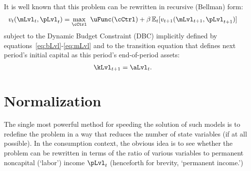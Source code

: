 \documentclass[titlepage, headings=optiontotocandhead]{Resources/texmf-local/tex/latex/econtex}
\begin{document}
It is well known that this problem can be rewritten in recursive (Bellman) form:
  \begin{equation}\begin{gathered}\begin{aligned}
        v_{t}(\mLvl_{t},\pLvl_{t})  & = \max_{\cCtrl}~ \uFunc(\cCtrl) + \beta \Ex_{t}[ v_{t+1}(\mLvl_{t+1},\pLvl_{t+1})]\label{eq:vrecurse}
      \end{aligned}\end{gathered}\end{equation}
subject to the Dynamic Budget Constraint (DBC) implicitly defined by equations~\eqref{eq:bLvl}-\eqref{eq:mLvl} and to the transition equation that defines next period's initial capital as this period's end-of-period assets:
\begin{equation}\begin{gathered}\begin{aligned}
      \kLvl_{t+1} & = \aLvl_{t}. \label{eq:transitionstate}
    \end{aligned}\end{gathered}\end{equation}



\hypertarget{normalization}{}
\section{Normalization}\label{sec:normalization}

The single most powerful method for speeding the solution of such models is to redefine the problem in a way that reduces the number of state variables (if at all possible).  In the consumption context, the obvious idea is to see whether the problem can be rewritten in terms of the ratio of various variables to permanent noncapital (`labor') income $\pLvl_{t}$ (henceforth for brevity, `permanent income.')
\end{document}
